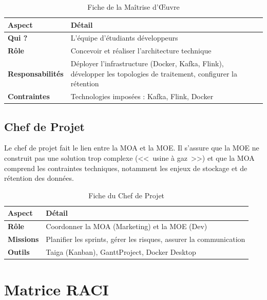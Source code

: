 \begin{table}[H]
\centering
\begin{tabularx}{\textwidth}{L{4cm} X}
\toprule
\textbf{\color{primarycolor}Aspect} & \textbf{\color{primarycolor}Détail} \\
\midrule
\textbf{Qui ?} & L'équipe d'étudiants développeurs \\
\addlinespace[0.1cm]
\textbf{Rôle} & Concevoir et réaliser l'architecture technique \\
\addlinespace[0.1cm]
\textbf{Responsabilités} & Déployer l'infrastructure (Docker, Kafka, Flink), développer les topologies de traitement, configurer la rétention \\
\addlinespace[0.1cm]
\textbf{Contraintes} & Technologies imposées : Kafka, Flink, Docker \\
\bottomrule
\end{tabularx}
\caption{Fiche de la Maîtrise d'Œuvre}
\end{table}

\subsection{Chef de Projet}

Le chef de projet fait le lien entre la MOA et la MOE. Il s'assure que la MOE ne construit pas une solution trop complexe (<<~usine à gaz~>>) et que la MOA comprend les contraintes techniques, notamment les enjeux de stockage et de rétention des données.

\begin{table}[H]
\centering
\begin{tabularx}{\textwidth}{L{4cm} X}
\toprule
\textbf{\color{primarycolor}Aspect} & \textbf{\color{primarycolor}Détail} \\
\midrule
\textbf{Rôle} & Coordonner la MOA (Marketing) et la MOE (Dev) \\
\addlinespace[0.1cm]
\textbf{Missions} & Planifier les sprints, gérer les risques, assurer la communication \\
\addlinespace[0.1cm]
\textbf{Outils} & Taiga (Kanban), GanttProject, Docker Desktop \\
\bottomrule
\end{tabularx}
\caption{Fiche du Chef de Projet}
\end{table}

\section{Matrice RACI}


